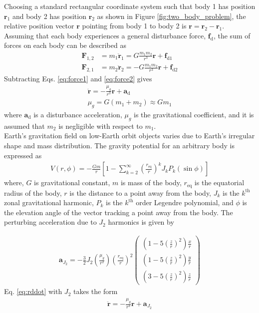 \documentclass[]{aiaa-tc}%
\begin{document}
Choosing a standard rectangular coordinate system such that body 1 has position $\mathbf{r}_1$ and body 2 has position $\mathbf{r}_2$ as shown in Figure \ref{fig:two_body_problem}, the relative position vector $\mathbf{r}$ pointing from body 1 to body 2 is $\mathbf{r}=\mathbf{r}_2-\mathbf{r}_1$. Assuming that each body experiences a general disturbance force, $\mathbf{f}_{\text{d}}$, the sum of forces on each body can be described as
\begin{subequations}
\begin{align}
\label{eq:force1}
\mathbf{F}_{1,2}&=m_1\mathbf{\ddot{r}}_1=G\frac{m_1m_2}{r^3}\mathbf{r}+\mathbf{f}_{\text{d1}}\\
\label{eq:force2}
\mathbf{F}_{2,1}&=m_2\mathbf{\ddot{r}}_2=-G\frac{m_1m_2}{r^3}\mathbf{r}+\mathbf{f}_{\text{d2}}
\end{align}
\end{subequations}
Subtracting Eqs. \eqref{eq:force1} and \eqref{eq:force2} gives
\begin{subequations}
\begin{gather}
\label{eq:rddot}
\mathbf{\ddot{r}}=-\frac{\mu_g}{r^3}\mathbf{r}+\mathbf{a}_{\text{d}}\\
\mu_g=G(m_1+m_2)\approx G m_1
\end{gather}
\end{subequations}
where $\mathbf{a}_{\text{d}}$ is a disturbance acceleration, $\mu_g$ is the gravitational coefficient, and it is assumed that $m_2$ is negligible with respect to $m_1$.\\

Earth's gravitation field on low-Earth orbit objects varies due to Earth's irregular shape and mass distribution. The gravity potential for an arbitrary body is expressed as \cite{schaub_analytical_2009}
\begin{align}
V(r,\phi)=-\frac{Gm}{r}\left[1-\sum\limits_{k=2}^\infty\left(\frac{r_{\text{eq}}}{r}\right)^k J_k P_k (\sin\phi)\right]
\end{align}
where, $G$ is gravitational constant, $m$ is mass of the body, $r_{\text{eq}}$ is the equatorial radius of the body, $r$ is the distance to a point away from the body, $J_k$ is the $k^{\text{th}}$ zonal gravitational harmonic, $P_k$ is the $k^{\text{th}}$ order Legendre polynomial, and $\phi$ is the elevation angle of the vector tracking a point away from the body. The perturbing acceleration due to $J_2$ harmonics is given by

\begin{align}
\mathbf{a}_{J_2}=-\frac{3}{2}J_2\left(\frac{\mu_g}{r^2}\right)\left(\frac{r_{\text{eq}}}{r}\right)^2\left(\begin{array}{c}
\left(1-5\left(\frac{z}{r}\right)^2\right)\frac{x}{r}\\
\left(1-5\left(\frac{z}{r}\right)^2\right)\frac{y}{r}\\
\left(3-5\left(\frac{z}{r}\right)^2\right)\frac{z}{r} \end{array}\right)
\end{align}
Eq. \eqref{eq:rddot} with $J_2$ takes the form
\begin{gather}
\mathbf{\ddot{r}}=-\frac{\mu_g}{r^3}\mathbf{r}+\mathbf{a}_{J_2}
\end{gather}
\end{document}
